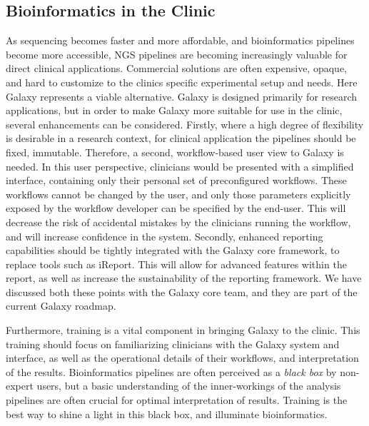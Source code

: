 \subsection{Bioinformatics in the Clinic}
As sequencing becomes faster and more affordable, and bioinformatics pipelines become more accessible, NGS pipelines are becoming increasingly valuable for direct clinical applications.
Commercial solutions are often expensive, opaque, and hard to customize to the clinics specific experimental setup and needs. Here Galaxy represents a viable alternative. Galaxy is designed primarily for research applications, but in order to make Galaxy more suitable for use in the clinic, several enhancements can be considered.
Firstly, where a high degree of flexibility is desirable in a research context, for clinical application the pipelines should be fixed, immutable.
Therefore, a second, workflow-based user view to Galaxy is needed. In this user perspective, clinicians would be presented with a simplified interface, containing only their personal set of preconfigured workflows.
These workflows cannot be changed by the user, and only those parameters explicitly exposed by the workflow developer can be specified by the end-user. This will decrease the risk of accidental mistakes by the clinicians running the workflow, and will increase confidence in the system.
Secondly, enhanced reporting capabilities should be tightly integrated with the Galaxy core framework, to replace tools such as iReport.
This will allow for advanced features within the report, as well as increase the sustainability of the reporting framework.
We have discussed both these points with the Galaxy core team, and they are part of the current Galaxy roadmap.

Furthermore, training is a vital component in bringing Galaxy to the clinic. This training should focus on familiarizing clinicians with the Galaxy system and interface, as well as the operational details of their workflows, and interpretation of the results. Bioinformatics pipelines  are often perceived as a \emph{black box} by non-expert users, but a basic understanding of the inner-workings of the analysis pipelines are often crucial for optimal interpretation of results. Training is the best way to shine a light in this black box, and illuminate bioinformatics.


